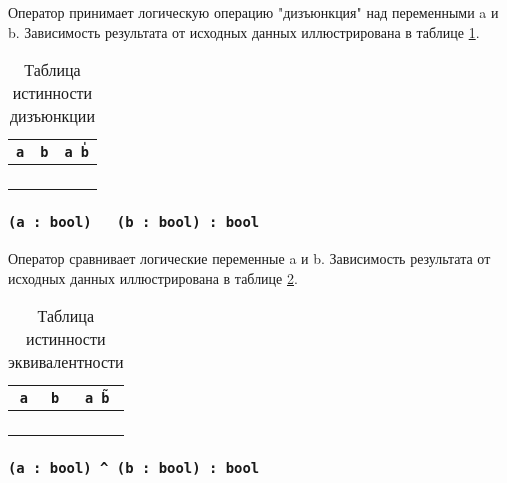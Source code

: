 Оператор принимает логическую операцию "дизъюнкция" над переменными a и b. Зависимость результата от исходных данных иллюстрирована в таблице \ref{distable}.

\begin{table}[htb]
	\caption{Таблица истинности дизъюнкции}
	\label{distable}
	\begin{tabular}{|c|c|c|}
		\hline
		\texttt{a} & \texttt{b} & \texttt{a \| b} 	\\ \hline
		\false{} & \false{} & \false{} 		\\ \hline
		\false{} & \true{}  & \true{}  		\\ \hline
		\true{}  & \false{} & \true{}  		\\ \hline
		\true{}  & \true{}  & \true{}  		\\ \hline
	\end{tabular}
	\vspace{-2em}
\end{table}

\subsubsection{\texttt{(a : bool) ~ (b : bool) : bool}}

Оператор сравнивает логические переменные a и b. Зависимость результата от исходных данных иллюстрирована в таблице \ref{logeqtable}.

\begin{table}[htb]
	\caption{Таблица истинности эквивалентности}
	\label{logeqtable}
	\begin{tabular}{|c|c|c|}
		\hline
		\texttt{a} & \texttt{b} & \texttt{a \~ b} \\ \hline
		\false{} & \false{} & \true{}   	\\ \hline
		\false{} & \true{}  & \false{}  	\\ \hline
		\true{}  & \false{} & \false{}  	\\ \hline
		\true{}  & \true{}  & \true{}   	\\ \hline
	\end{tabular}
	\vspace{0em}
\end{table}

\subsubsection{\texttt{(a : bool) ^ (b : bool) : bool}}

